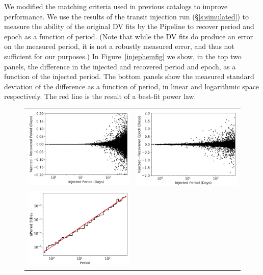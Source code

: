 We modified the matching criteria used in previous catalogs to improve performance. We use the results of the transit injection run (\S\ref{s:simulated}) to measure the ability of the original DV fits by the \kepler{} Pipeline to recover period and epoch as a function of period. (Note that while the DV fits do produce an error on the measured period, it is not a robustly measured error, and thus not sufficient for our purposes.) In Figure~\ref{injephemfig} we show, in the top two panels, the difference in the injected and recovered period and epoch, as a function of the injected period. The bottom panels show the measured standard deviation of the difference as a function of period, in linear and logarithmic space respectively. The red line is the result of a best-fit power law.

\begin{figure}[ht]
\centering
\begin{tabular}{cc}
\includegraphics[width=0.5\linewidth]{INJ1-Ephem-Recovery-1.png} &
\includegraphics[width=0.5\linewidth]{INJ1-Ephem-Recovery-2.png} \\
\includegraphics[width=0.5\linewidth]{INJ1-Ephem-Recovery-3.png} &

\end{tabular}
\end{figure}
